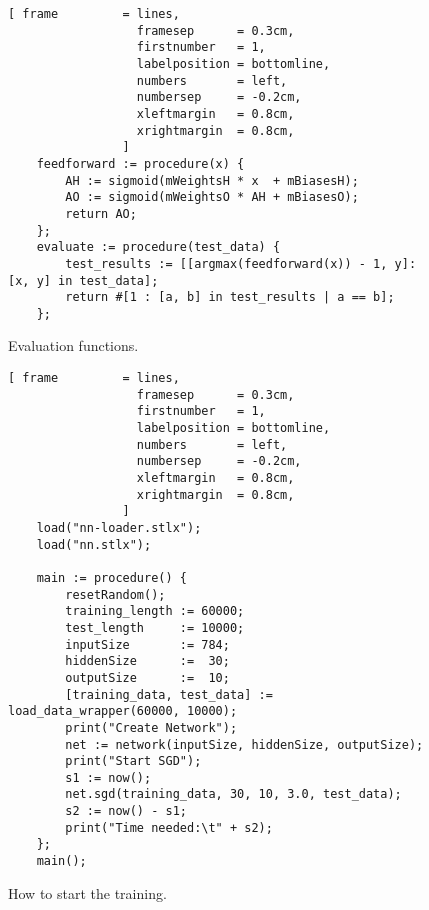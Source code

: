 \begin{figure}[!ht]
\centering
\begin{Verbatim}[ frame         = lines, 
                  framesep      = 0.3cm, 
                  firstnumber   = 1,
                  labelposition = bottomline,
                  numbers       = left,
                  numbersep     = -0.2cm,
                  xleftmargin   = 0.8cm,
                  xrightmargin  = 0.8cm,
                ]
    feedforward := procedure(x) {
        AH := sigmoid(mWeightsH * x  + mBiasesH);
        AO := sigmoid(mWeightsO * AH + mBiasesO);
        return AO;
    };
    evaluate := procedure(test_data) {
        test_results := [[argmax(feedforward(x)) - 1, y]: [x, y] in test_data];
        return #[1 : [a, b] in test_results | a == b];
    };
\end{Verbatim}
\vspace*{-0.3cm}
\caption{Evaluation functions.}
\label{fig:nn.stlx:evaluation}
\end{figure}

\begin{figure}[!ht]
\centering
\begin{Verbatim}[ frame         = lines, 
                  framesep      = 0.3cm, 
                  firstnumber   = 1,
                  labelposition = bottomline,
                  numbers       = left,
                  numbersep     = -0.2cm,
                  xleftmargin   = 0.8cm,
                  xrightmargin  = 0.8cm,
                ]
    load("nn-loader.stlx");
    load("nn.stlx");
    
    main := procedure() {
        resetRandom();
        training_length := 60000;
        test_length     := 10000;
        inputSize       := 784;
        hiddenSize      :=  30;
        outputSize      :=  10;
        [training_data, test_data] := load_data_wrapper(60000, 10000);
        print("Create Network");
        net := network(inputSize, hiddenSize, outputSize);
        print("Start SGD");
        s1 := now();
        net.sgd(training_data, 30, 10, 3.0, test_data);
        s2 := now() - s1;
        print("Time needed:\t" + s2);
    };
    main();
\end{Verbatim}
\vspace*{-0.3cm}
\caption{How to start the training.}
\label{fig:nn-start.stlx}
\end{figure}

